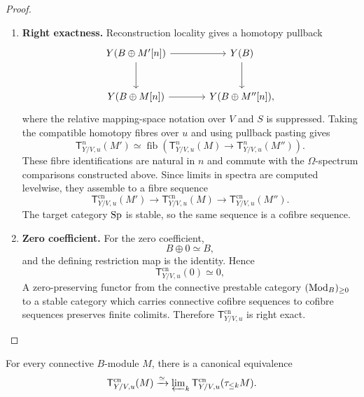 \begin{proof}
\begin{enumerate}[label=\textup{(\arabic*)}]
    displayed square is a nilpotent-excision square.
    \item \textbf{Right exactness.}
    Reconstruction locality gives a homotopy pullback
    \[
    \begin{tikzcd}[column sep=large,row sep=large]
        Y(B\oplus M'[n]) \arrow[r] \arrow[d]
            & Y(B) \arrow[d]
        \\
        Y(B\oplus M[n]) \arrow[r]
            & Y(B\oplus M''[n]),
    \end{tikzcd}
    \]
    where the relative mapping-space notation over \(V\) and \(S\) is suppressed.
    Taking the compatible homotopy fibres over \(u\) and using pullback pasting
    gives
    \[
        \mathsf T^n_{Y/V,u}(M')
        \simeq
        \operatorname{fib}
        \left(
            \mathsf T^n_{Y/V,u}(M)
            \longrightarrow
            \mathsf T^n_{Y/V,u}(M'')
        \right).
    \]
    These fibre identifications are natural in \(n\) and commute with the
    \(\Omega\)-spectrum comparisons constructed above. Since limits in spectra
    are computed levelwise, they assemble to a fibre sequence
    \[
        \mathsf T^{\mathrm{cn}}_{Y/V,u}(M')
        \longrightarrow
        \mathsf T^{\mathrm{cn}}_{Y/V,u}(M)
        \longrightarrow
        \mathsf T^{\mathrm{cn}}_{Y/V,u}(M'').
    \]
    The target category \(\operatorname{Sp}\) is stable, so the same sequence is a cofibre
    sequence.
    \item \textbf{Zero coefficient.}
    For the zero coefficient,
    \[
        B\oplus0\simeq B,
    \]
    and the defining restriction map is the identity. Hence
    \[
        \mathsf T^{\mathrm{cn}}_{Y/V,u}(0)\simeq0,
    \]
    A zero-preserving functor from the connective prestable category
    \((\operatorname{Mod}_B)_{\geq0}\) to a stable category which carries connective
    cofibre sequences to cofibre sequences preserves finite colimits. Therefore
    \(\mathsf T^{\mathrm{cn}}_{Y/V,u}\) is right exact.
\end{enumerate}
\end{proof}


\begin{proposition}
\label{prop:split-tangent-postnikov-continuity}
For every connective \(B\)-module \(M\), there is a canonical equivalence
\[
    \mathsf T^{\mathrm{cn}}_{Y/V,u}(M)
    \xrightarrow{\simeq}
    \varprojlim\nolimits_k
    \mathsf T^{\mathrm{cn}}_{Y/V,u}(\tau_{\leq k}M).
\]
\end{proposition}

